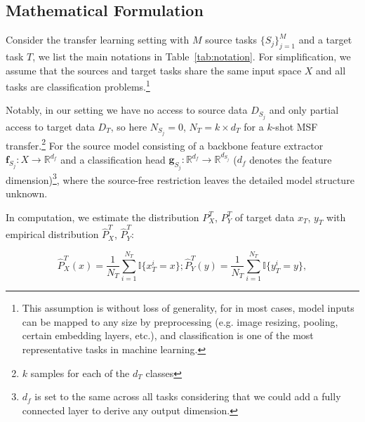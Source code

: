 \documentclass[letterpaper]{article} %
\begin{document}
\subsection{Mathematical Formulation}


Consider the transfer learning setting with $M$ source tasks $\{S_j\}_{j=1}^M$ and a target task $T$, we list the main notations in Table~\ref{tab:notation}.  For simplification, we assume that the sources and target tasks share the same input space $X$ and all tasks are classification problems.\footnote{This assumption is without loss of generality, for in most cases,
model inputs can be mapped to any size by preprocessing (e.g. image resizing, pooling, certain embedding layers, etc.), 
and classification is one of the most representative tasks in machine learning.}

Notably, in our setting we have no access to source data $D_{S_j}$ and only partial access to target data $D_T$, so here $N_{S_j} = 0$, $N_T = k \times d_T$ for a $k$-shot MSF transfer.\footnote{$k$ samples for each of the $d_T$ classes} 
For the source model consisting of a backbone feature extractor $\boldsymbol{f}_{S_j}: X \to \mathbb{R}^{d_f}$ and a classification head $\boldsymbol{g}_{S_j}: \mathbb{R}^{d_f} \to \mathbb{R}^{d_{S_j}}$ ($d_f$ denotes the feature dimension)\footnote{$d_f$ is set to the same across all tasks considering that we could add a fully connected layer to derive any output dimension.}, where the source-free restriction leaves the detailed model structure unknown.



In computation, we estimate the distribution $P^T_{X}$, $P^T_{Y}$ of target data $x_T$, $y_T$ with empirical distribution $\hat P^T_{X}$, $\hat P^T_{Y}$:

\begin{equation}
\hat P_{X}^T (x)= \frac{1}{N_T}\sum_{i=1}^{N_T}\mathbb{I}\{x_T^i=x\}; \hat P_{Y}^T (y)= \frac{1}{N_T}\sum_{i=1}^{N_T}\mathbb{I}\{y_T^i=y\}, 
\label{py}
\end{equation}
\end{document}
